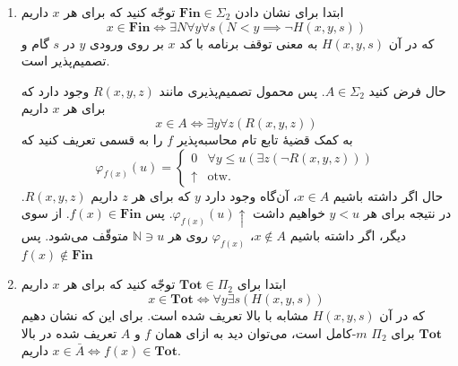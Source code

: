 \begin{enumerate}
  \item ابتدا برای نشان دادن $\mathbf{Fin} \in \Sigma_2$ توجّه کنید که برای هر $x$ داریم
  $$ x \in \mathbf{Fin} \iff \exists N \forall y \forall s (N < y \implies \neg H(x, y, s)) $$
  که در آن $H(x, y, s)$ به معنی توقف برنامه با کد $x$ بر روی ورودی $y$ در $s$ گام و تصمیم‌پذیر است.

  حال فرض کنید $A \in \Sigma_2$. پس محمول تصمیم‌پذیری مانند $R(x, y, z)$ وجود دارد که برای هر $x$ داریم
  $$ x \in A \iff \exists y \forall z (R(x, y, z)) $$
  به کمک قضیهٔ  تابع تام محاسبه‌پذیر $f$ را به قسمی تعریف کنید که
  $$\varphi_{f(x)}(u) = \begin{cases}
    0 & \forall y \le u (\exists z (\neg R(x, y, z))) \\
    \uparrow & \text{otw.}
  \end{cases}$$
  حال اگر داشته باشیم $x \in A$، آن‌گاه وجود دارد $y$ که برای هر $z$ داریم $R(x, y, z)$. در نتیجه برای هر $y < u$ خواهیم داشت $\varphi_{f(x)}(u)\uparrow$. پس $f(x) \in \mathbf{Fin}$. از سوی دیگر، اگر داشته باشیم $x \not \in A$، $\varphi_{f(x)}$ روی هر $\mathbb{N} \ni u$ متوقّف می‌شود. پس $f(x) \not \in \mathbf{Fin}$

  \item ابتدا برای $\mathbf{Tot} \in \Pi_2$ توجّه کنید که برای هر $x$ داریم
  $$ x \in \mathbf{Tot} \iff \forall y \exists s (H(x, y, s)) $$
  که در آن $H(x, y, s)$ مشابه با بالا تعریف شده است. برای این که نشان دهیم $\mathbf{Tot}$ برای $\Pi_2$ $m$-کامل است، می‌توان دید به ازای همان $f$ و $A$ تعریف شده در بالا داریم
  $x \in \bar{A} \iff f(x) \in \mathbf{Tot}$.
\end{enumerate}